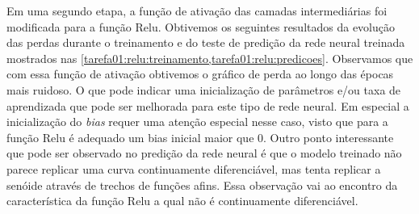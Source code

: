 Em uma segundo etapa, a função de ativação das camadas intermediárias foi 
modificada para a função Relu. Obtivemos os seguintes resultados da evolução 
das perdas durante o treinamento e do teste de predição da rede neural treinada 
mostrados nas \cref{tarefa01:relu:treinamento,tarefa01:relu:predicoes}. 
Observamos que com essa função de ativação obtivemos o gráfico de perda ao 
longo das épocas mais ruidoso. O que pode indicar uma inicialização de 
parâmetros e/ou taxa de aprendizada que pode ser melhorada para este tipo de 
rede neural. Em especial a inicialização do \emph{bias} requer uma atenção 
especial nesse caso, visto que para a função Relu é adequado um bias inicial 
maior que 0. 
Outro ponto interessante que pode ser observado no predição da rede neural é que o modelo treinado não parece replicar uma curva continuamente diferenciável, mas tenta replicar a senóide através de trechos de funções afins. Essa observação vai ao encontro da característica da função Relu a qual não é continuamente diferenciável.

